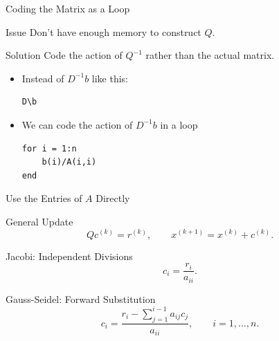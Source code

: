 \documentclass[10pt]{beamer}
\begin{document}
\begin{frame}[fragile]{Coding the Matrix as a Loop}

\begin{block}{Issue}
    Don't have enough memory to construct $Q$.
\end{block}
\begin{block}{Solution}
    Code the action of $Q^{-1}$ rather than the actual matrix.
\end{block}

\begin{itemize}
    \item Instead of $D^{-1}b$ like this:
\begin{lstlisting}
D\b
\end{lstlisting}   
    \item We can code the action of $D^{-1}b$ in a loop
\begin{lstlisting}
for i = 1:n
    b(i)/A(i,i)
end
\end{lstlisting}
      
\end{itemize}
\end{frame}


\begin{frame}{Use the Entries of $A$ Directly}

\begin{block}{General Update}
\[
    Qc^{(k)}=r^{(k)},
    \qquad
    x^{(k+1)}=x^{(k)}+c^{(k)}.
\]
\end{block}

\begin{block}{Jacobi: Independent Divisions}
\[
    c_i=\frac{r_i}{a_{ii}}.
\]
\end{block}

\begin{block}{Gauss-Seidel: Forward Substitution}
\[
    c_i=
    \frac{r_i-\displaystyle\sum_{j=1}^{i-1}a_{ij}c_j}
         {a_{ii}},
    \qquad i=1,\ldots,n.
\]
\end{block}


\end{frame}
\end{document}
